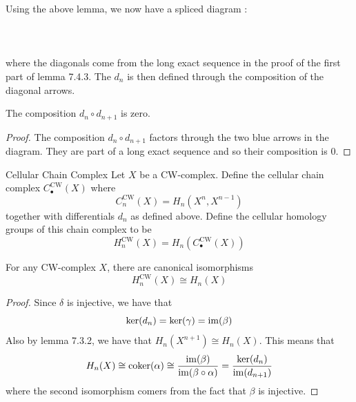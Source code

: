 \documentclass[a4paper]{article}
\begin{document}
Using the above lemma, we now have a spliced diagram : 
\\~\\
\\~\\
where the diagonals come from the long exact sequence in the proof of the first part of lemma 7.4.3. The $d_n$ is then defined through the composition of the diagonal arrows. 

\begin{lmm}{}{} The composition $d_n\circ d_{n+1}$ is zero. \tcbline
\begin{proof}
The composition $d_n\circ d_{n+1}$ factors through the two blue arrows in the diagram. They are part of a long exact sequence and so their composition is $0$. 
\end{proof}
\end{lmm}

\begin{defn}{Cellular Chain Complex}{} Let $X$ be a CW-complex. Define the cellular chain complex $C_\bullet^\text{CW}(X)$ where $$C_n^{\text{CW}}(X)=H_n(X^n,X^{n-1})$$ together with differentials $d_n$ as defined above. Define the cellular homology groups of this chain complex to be $$H_n^\text{CW}(X)=H_n(C_\bullet^\text{CW}(X))$$
\end{defn}

\begin{lmm}{}{} For any CW-complex $X$, there are canonical isomorphisms $$H_n^\text{CW}(X)\cong H_n(X)$$ \tcbline
\begin{proof}
Since $\delta$ is injective, we have that $$\ker(d_n)=\ker(\gamma)=\operatorname{im}(\beta)$$ Also by lemma 7.3.2, we have that $H_n(X^{n+1})\cong H_n(X)$. This means that $$H_n(X)\cong\text{coker}(\alpha)\cong\frac{\operatorname{im}(\beta)}{\operatorname{im}(\beta\circ\alpha)}=\frac{\ker(d_n)}{\operatorname{im}(d_{n+1})}$$ where the second isomorphism comers from the fact that $\beta$ is injective. 
\end{proof}
\end{lmm}
\end{document}

